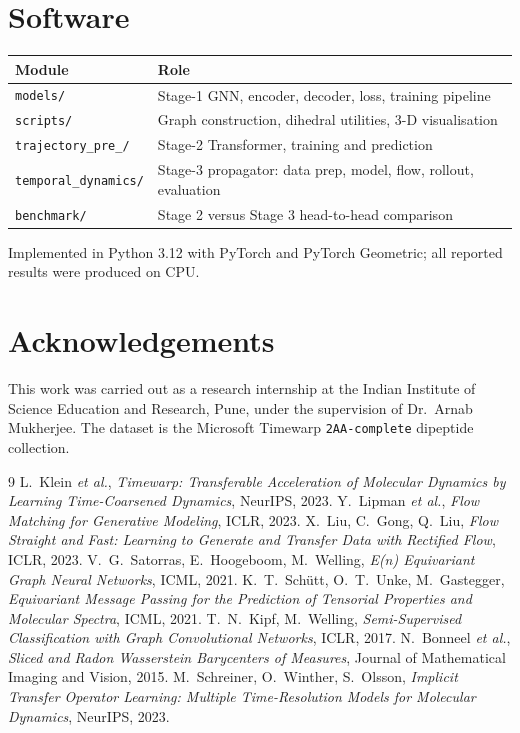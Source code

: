 \documentclass[11pt,a4paper]{article}
\begin{document}
\section{Software}

\begin{center}
\small
\begin{tabular}{@{}ll@{}}
\toprule
Module & Role \\
\midrule
\texttt{models/} & Stage-1 GNN, encoder, decoder, loss, training pipeline \\
\texttt{scripts/} & Graph construction, dihedral utilities, 3-D visualisation \\
\texttt{trajectory\_pre\_/} & Stage-2 Transformer, training and prediction \\
\texttt{temporal\_dynamics/} & Stage-3 propagator: data prep, model, flow, rollout, evaluation \\
\texttt{benchmark/} & Stage 2 versus Stage 3 head-to-head comparison \\
\bottomrule
\end{tabular}
\end{center}

Implemented in Python 3.12 with PyTorch and PyTorch Geometric; all reported
results were produced on CPU.

\section*{Acknowledgements}

This work was carried out as a research internship at the Indian Institute of
Science Education and Research, Pune, under the supervision of
Dr.\ Arnab Mukherjee. The dataset is the Microsoft Timewarp
\texttt{2AA-complete} dipeptide collection.

\begin{thebibliography}{9}
 L.~Klein \emph{et al.},
\emph{Timewarp: Transferable Acceleration of Molecular Dynamics by Learning
Time-Coarsened Dynamics}, NeurIPS, 2023.
 Y.~Lipman \emph{et al.},
\emph{Flow Matching for Generative Modeling}, ICLR, 2023.
 X.~Liu, C.~Gong, Q.~Liu,
\emph{Flow Straight and Fast: Learning to Generate and Transfer Data with
Rectified Flow}, ICLR, 2023.
 V.~G.~Satorras, E.~Hoogeboom, M.~Welling,
\emph{E(n) Equivariant Graph Neural Networks}, ICML, 2021.
 K.~T.~Sch\"utt, O.~T.~Unke, M.~Gastegger,
\emph{Equivariant Message Passing for the Prediction of Tensorial Properties
and Molecular Spectra}, ICML, 2021.
 T.~N.~Kipf, M.~Welling,
\emph{Semi-Supervised Classification with Graph Convolutional Networks},
ICLR, 2017.
 N.~Bonneel \emph{et al.},
\emph{Sliced and Radon Wasserstein Barycenters of Measures},
Journal of Mathematical Imaging and Vision, 2015.
 M.~Schreiner, O.~Winther, S.~Olsson,
\emph{Implicit Transfer Operator Learning: Multiple Time-Resolution Models for
Molecular Dynamics}, NeurIPS, 2023.
\end{thebibliography}
\end{document}
